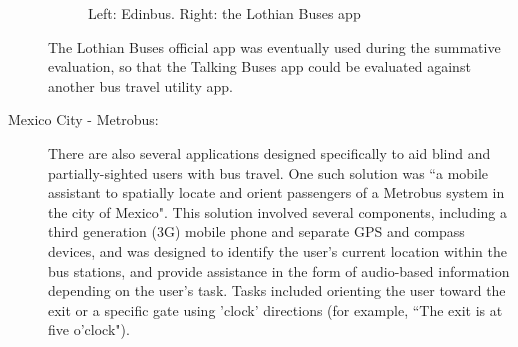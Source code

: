 \documentclass[10pt,twocolumn]{article}
\newcommand{\citep}[1]{}
\begin{document}
\begin{description}
\begin{figure}[htbp]
\begin{minipage}[b]{0.45\linewidth}
      \end{minipage}
                      \caption{Left:  Edinbus.  Right: the Lothian Buses app}
\end{figure}

The Lothian Buses official app was eventually used during the summative evaluation, so that the Talking Buses app could be evaluated against another bus travel utility app.

\item[Mexico City - Metrobus:]
There are also several applications designed specifically to aid blind and partially-sighted users with bus travel. One such solution was ``a mobile assistant to spatially locate and orient passengers of a Metrobus system in the city of Mexico"\citep{metrobus}. This solution involved several components, including a third generation (3G) mobile phone and separate GPS and compass devices, and was designed to identify the user's current location within the bus stations, and provide assistance in the form of audio-based information depending on the user's task. Tasks included orienting the user toward the exit or a specific gate using 'clock' directions (for example, ``The exit is at five o'clock").


\end{description}
\end{document}
